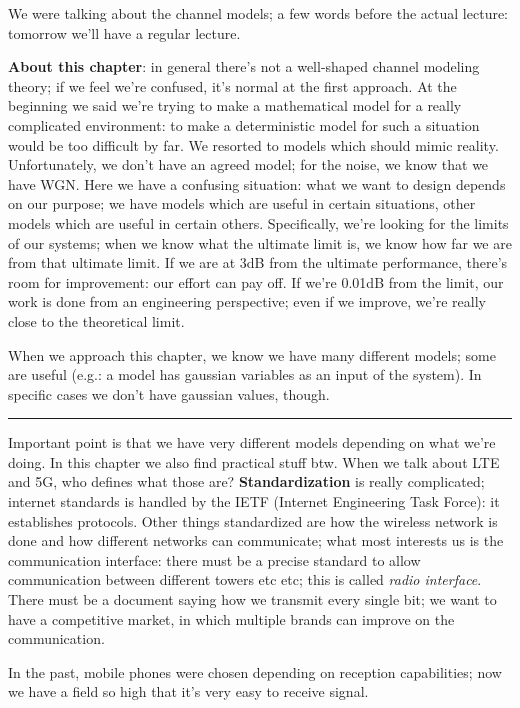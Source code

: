 \documentclass[a4paper, 12pt]{book}
\begin{document}
\begin{greenbar}
We were talking about the channel models; a few words before the actual lecture: tomorrow we'll have a regular lecture.
\end{greenbar}

\textbf{About this chapter}: in general there's not a well-shaped channel modeling theory; if we feel we're confused, it's normal at the first approach. At the beginning we said we're trying to make a mathematical model for a really complicated environment: to make a deterministic model for such a situation would be too difficult by far.
We resorted to models which should mimic reality. Unfortunately, we don't have an agreed model; for the noise, we know that we have WGN. Here we have a confusing situation: what we want to design depends on our purpose; we have models which are useful in certain situations, other models which are useful in certain others.
Specifically, we're looking for the limits of our systems; when we know what the ultimate limit is, we know how far we are from that ultimate limit.
If we are at 3dB from the ultimate performance, there's room for improvement: our effort can pay off. If we're 0.01dB from the limit, our work is done from an engineering perspective; even if we improve, we're really close to the theoretical limit.

When we approach this chapter, we know we have many different models; some are useful (e.g.: a model has gaussian variables as an input of the system). In specific cases we don't have gaussian values, though.

\noindent\rule{\textwidth}{0.4pt}

Important point is that we have very different models depending on what we're doing.
In this chapter we also find practical stuff btw. When we talk about LTE and 5G, who defines what those are?
\textbf{Standardization} is really complicated; internet standards is handled by the IETF (Internet Engineering Task Force): it establishes protocols. Other things standardized are how the wireless network is done and how different networks can communicate; what most interests us is the communication interface: there must be a precise standard to allow communication between different towers etc etc; this is called \textit{radio interface}.
There must be a document saying how we transmit every single bit; we want to have a competitive market, in which multiple brands can improve on the communication.

\begin{greenbar}
In the past, mobile phones were chosen depending on reception capabilities; now we have a field so high that it's very easy to receive signal.
\end{greenbar}
\end{document}
